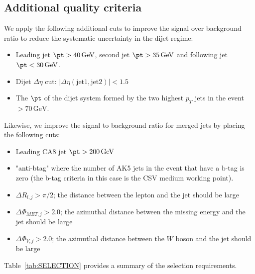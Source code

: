 
\subsection{Additional quality criteria}
\label{sec:evtSelAdditionalCuts}
We apply the following additional cuts to improve 
the signal over background ratio to reduce the systematic 
uncertainty in the dijet regime:
\begin{itemize}
\item 
Leading jet $\pt > 40\,\mathrm{GeV}$, second jet $\pt > 35\,\mathrm{GeV}$ and following jet $\pt < 30\,\mathrm{GeV}$.
\item 
Dijet $\Delta \eta$ cut: $|\Delta\eta (\mathrm{jet1, jet2})| < 1.5$ 
\item 
The $\pt$ of the dijet system formed by the two highest $p_{T}$
jets in the event $ > 70\,\mathrm{GeV}$.
\end{itemize}
Likewise, we improve the signal to background ratio for merged jets by placing the following cuts:
\begin{itemize}
\item Leading CA8 jet $\pt > 200\,\mathrm{GeV}$
\item "anti-btag" where the number of AK5 jets in the event that have a b-tag is zero (the b-tag criteria in this case is the CSV medium working point).
\item $\Delta R_{l,j} > \pi/2$; the distance between the lepton and the jet should be large
\item $\Delta \Phi_{MET,j} > 2.0$; the azimuthal distance between the missing energy and the jet should be large
\item $\Delta \Phi_{V,j} > 2.0$; the azimuthal distance between the $W$ boson and the jet should be large
\end{itemize}
Table~\ref{tab:SELECTION} provides a summary of the selection requirements. 
\\
